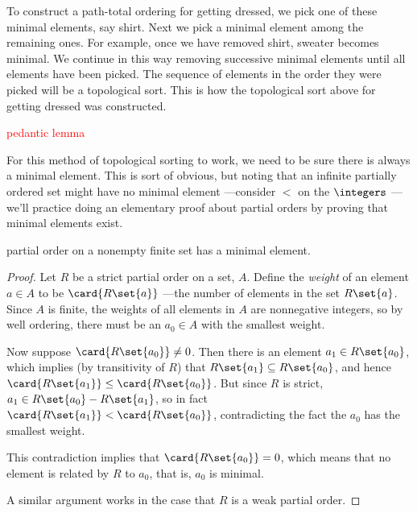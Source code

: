 To construct a path-total ordering for getting dressed, we pick one of these
minimal elements, say shirt.  Next we pick a minimal element among the
remaining ones.  For example, once we have removed shirt, sweater becomes
minimal.  We continue in this way removing successive minimal elements
until all elements have been picked.  The sequence of elements in the
order they were picked will be a topological sort.  This is how the
topological sort above for getting dressed was constructed.

\begin{staffnotes}
\textcolor{red}{pedantic lemma}

For this method of topological sorting to work, we need to be sure
there is always a minimal element.  This is sort of obvious, but
noting that an infinite partially ordered set might have no minimal
element ---consider $<$ on the $\integers$ ---we'll practice doing an
elementary proof about partial orders by proving that minimal elements
exist.

\begin{lemma}\label{finmin}
   partial order on a nonempty finite set
  has a minimal element.

\begin{proof} Let $R$ be a strict partial order on a set, $A$.  Define the \emph{weight}
of an element $a \in A$ to be $\card{R\set{a}}$ ---the number of
elements in the set $R\set{a}$.  Since $A$ is finite, the weights of
all elements in $A$ are nonnegative integers, so by well ordering,
there must be an $a_0 \in A$ with the smallest weight.

Now suppose $\card{R\set{a_0}} \neq 0$.  Then there is an element $a_1 \in
R\set{a_0}$, which implies (by transitivity of $R$) that $R\set{a_1}
\subseteq R\set{a_0}$, and hence $\card{R\set{a_1}} \leq
\card{R\set{a_0}}$.  But since $R$ is strict, $a_1 \in R\set{a_0} -
R\set{a_1}$, so in fact $\card{R\set{a_1}} < \card{R\set{a_0}}$,
contradicting the fact the $a_0$ has the smallest weight.

This contradiction implies that $\card{R\set{a_0}} = 0$, which means that
no element is related by $R$ to $a_0$, that is, $a_0$ is minimal.

A similar argument works in the case that $R$ is a weak partial order.

\end{proof}
\end{lemma}

\end{staffnotes}

